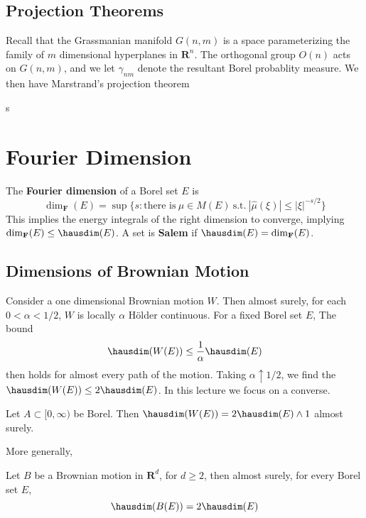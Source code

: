 \section{Projection Theorems}

Recall that the Grassmanian manifold $G(n,m)$ is a space parameterizing the family of $m$ dimensional hyperplanes in $\mathbf{R}^n$. The orthogonal group $O(n)$ acts on $G(n,m)$, and we let $\gamma_{nm}$ denote the resultant Borel probablity measure. We then have Marstrand's projection theorem

\begin{theorem}[Marstrand]
	s
\end{theorem}






\chapter{Fourier Dimension}

The {\bf Fourier dimension} of a Borel set $E$ is
%
\[ \dim_{\mathbf{F}}(E) = \sup \{s : \text{there is}\ \mu \in M(E)\ \text{s.t.}\ |\widehat{\mu}(\xi)| \leq |\xi|^{-s/2}  \} \]
%
This implies the energy integrals of the right dimension to converge, implying $\dim_{\mathbf{F}}(E) \leq \hausdim(E)$. A set is {\bf Salem} if $\hausdim(E) = \dim_{\mathbf{F}}(E)$.

\section{Dimensions of Brownian Motion}

Consider a one dimensional Brownian motion $W$. Then almost surely, for each $0 < \alpha < 1/2$, $W$ is locally $\alpha$ H\"{o}lder continuous. For a fixed Borel set $E$, The bound
%
\[ \hausdim(W(E)) \leq \frac{1}{\alpha} \hausdim(E) \]
%
then holds for almost every path of the motion. Taking $\alpha \uparrow 1/2$, we find the $\hausdim(W(E)) \leq 2 \hausdim(E)$. In this lecture we focus on a converse.

\begin{theorem}[Mckean, 1955]
	Let $A \subset [0,\infty)$ be Borel. Then $\hausdim(W(E)) = 2\hausdim(E) \wedge 1$ almost surely.
\end{theorem}

More generally,

\begin{theorem}
	Let $B$ be a Brownian motion in $\mathbf{R}^d$, for $d \geq 2$, then almost surely, for every Borel set $E$,
	\[\hausdim(B(E)) = 2\hausdim(E) \]
\end{theorem}

